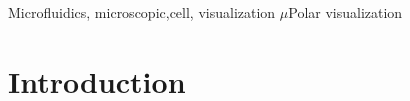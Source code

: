 \documentclass[conference]{IEEEtran}
\begin{document}
\begin{IEEEkeywords}
Microfluidics, microscopic,cell, visualization  $\mu$Polar visualization 
\end{IEEEkeywords}

\section{Introduction}




 
 

 
 
 
 
 
 
\end{document}

